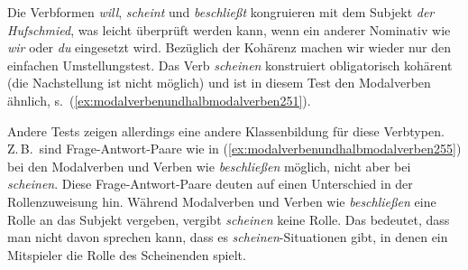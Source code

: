 \begin{exe}
  \ex\label{ex:modalverbenundhalbmodalverben247}
  \begin{xlist}
  \end{xlist}
\end{exe}


Die Verbformen \textit{will}, \textit{scheint} und \textit{beschließt} kongruieren mit dem Subjekt \textit{der Hufschmied}, was leicht überprüft werden kann, wenn ein anderer Nominativ wie \textit{wir} oder \textit{du} eingesetzt wird.
Bezüglich der Kohärenz machen wir wieder nur den einfachen Umstellungstest.
Das Verb \textit{scheinen} konstruiert obligatorisch kohärent (die Nachstellung ist nicht möglich) und ist in diesem Test den Modalverben ähnlich, s.\ (\ref{ex:modalverbenundhalbmodalverben251}).

\begin{exe}
  \ex\label{ex:modalverbenundhalbmodalverben251}
  \begin{xlist}
  \end{xlist}
\end{exe}

Andere Tests zeigen allerdings eine andere Klassenbildung für diese Verbtypen.
Z.\,B.\ sind Frage-Antwort-Paare wie in (\ref{ex:modalverbenundhalbmodalverben255}) bei den Modalverben und Verben wie \textit{beschließen} möglich, nicht aber bei \textit{scheinen}.
Diese Frage-Antwort-Paare deuten auf einen Unterschied in der Rollenzuweisung hin.
Während Modalverben und Verben wie \textit{beschließen} eine Rolle an das Subjekt vergeben, vergibt \textit{scheinen} keine Rolle.
Das bedeutet, dass man nicht davon sprechen kann, dass es \textit{scheinen}-Situationen gibt, in denen ein Mitspieler die Rolle des Scheinenden spielt.

\begin{exe}
  \ex\label{ex:modalverbenundhalbmodalverben255}
  \begin{xlist}
  \end{xlist}
\end{exe}

